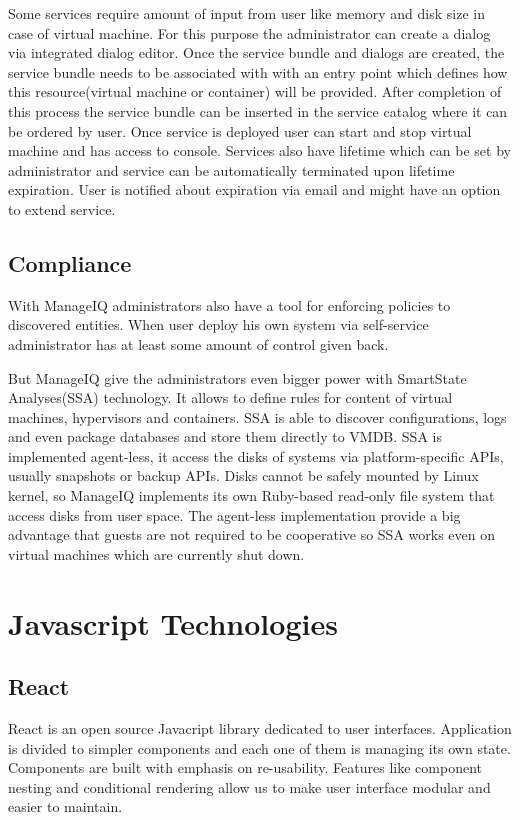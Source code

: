 Some services require amount of input from user like memory and disk size in case of virtual machine. For this purpose the administrator can create a dialog via integrated dialog editor. Once the service bundle and dialogs are created, the service bundle needs to be associated with with an entry point which defines how this resource(virtual machine or container) will be provided. After completion of this process the service bundle can be inserted in the service catalog where it can be ordered by user. Once service is deployed user can start and stop virtual machine and has access to console. Services also have lifetime which can be set by administrator and service can be automatically terminated upon lifetime expiration. User is notified about expiration via email and might have an option to extend service.

\section{Compliance}
With ManageIQ administrators also have a tool for enforcing policies to discovered entities. When user deploy his own system via self-service administrator has at least some amount of control given back.

But ManageIQ give the administrators even bigger power with SmartState Analyses(SSA) technology. It allows to define rules for content of virtual machines, hypervisors and containers. SSA is able to discover configurations, logs and even package databases and store them directly to VMDB. SSA is implemented agent-less, it access the disks of systems via platform-specific APIs, usually snapshots or backup APIs. Disks cannot be safely mounted by Linux kernel, so ManageIQ implements its own Ruby-based read-only file system that access disks from user space. The agent-less implementation provide a big advantage that guests are not required to be cooperative so SSA works even on virtual machines which are currently shut down.

\chapter{Javascript Technologies}

\section{React}
React is an open source Javacript library dedicated to user interfaces. Application is divided to simpler components and each one of them is managing its own state. Components are built with emphasis on re-usability. Features like component nesting and conditional rendering\cite{conditional} allow us to make user interface modular and easier to maintain.

